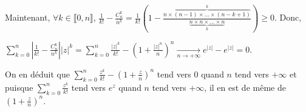{{Maintenant, $\forall k\in\llbracket0,n\rrbracket$, $ \frac{1}{k!}- \frac{C_n^k}{n^k}= \frac{1}{k!}\left(1-  \frac{\overbrace{n\times(n-1)\times\ldots\times(n-k+1)}^{k}}{\underbrace{n\times n\times\ldots\times n}_{k}}\right)\geqslant 0$. Donc,

\begin{center}
$\sum_{k=0}^{n}\left| \frac{1}{k!}- \frac{C_n^k}{n^k}\right||z|^k=\sum_{k=0}^{n} \frac{|z|^k}{k!}-\left(1+ \frac{|z|^n}{n}\right)^n\underset{n\rightarrow+\infty}{\rightarrow}e^{|z|}-e^{|z|}= 0$.
\end{center}

On en déduit que $\sum_{k=0}^{n} \frac{z^k}{k!}-\left(1+ \frac{z}{n}\right)^n$ tend vers $0$ quand $n$ tend vers $+\infty$ et puisque $\sum_{k=0}^{n} \frac{z^k}{k!}$ tend vers $e^z$ quand $n$ tend vers $+\infty$, il en est de même de $\left(1+ \frac{z}{n}\right)^n$.
}
}
